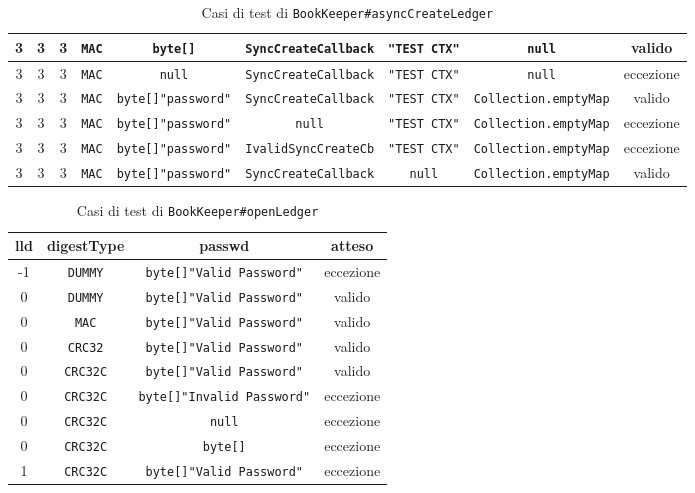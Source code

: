 \documentclass[10pt]{article}
\begin{document}
{\begin{table}[h]
{\begin{tabular}{|c|c|c|c|c|c|c|c|c|}
					\hline
					3 & 3 & 3 & \texttt{MAC} & \texttt{byte[]{}} & \texttt{SyncCreateCallback} & \texttt{"TEST CTX"} & \texttt{null} & valido \\
					\hline
					3 & 3 & 3 & \texttt{MAC} & \texttt{null} & \texttt{SyncCreateCallback} & \texttt{"TEST CTX"} & \texttt{null} & eccezione \\
					\hline
					3 & 3 & 3 & \texttt{MAC} & \texttt{byte[]{"password"}} & \texttt{SyncCreateCallback} & \texttt{"TEST CTX"} & \texttt{Collection.emptyMap} & valido \\
					\hline
					3 & 3 & 3 & \texttt{MAC} & \texttt{byte[]{"password"}} & \texttt{null} & \texttt{"TEST CTX"} & \texttt{Collection.emptyMap} & eccezione \\
					\hline
					3 & 3 & 3 & \texttt{MAC} & \texttt{byte[]{"password"}} & \texttt{IvalidSyncCreateCb} & \texttt{"TEST CTX"} & \texttt{Collection.emptyMap} & eccezione \\
					\hline
					3 & 3 & 3 & \texttt{MAC} & \texttt{byte[]{"password"}} & \texttt{SyncCreateCallback} & \texttt{null} & \texttt{Collection.emptyMap} & valido \\
					\hline
				\end{tabular}
			}
			\caption{Casi di test di \texttt{BookKeeper\#asyncCreateLedger}}
			\label{tab:test2}
		\end{table}
		
		
		\begin{table}[h]
			\centering
			\begin{tabular}{|c|c|c|c|}
				\hline
				\textbf{lld} & \textbf{digestType} & \textbf{passwd} & \textbf{atteso} \\
				\hline
				-1 & \texttt{DUMMY} & \texttt{byte[]{"Valid Password"}} & eccezione \\
				\hline
				0 & \texttt{DUMMY} & \texttt{byte[]{"Valid Password"}} & valido \\
				\hline
				0 & \texttt{MAC} & \texttt{byte[]{"Valid Password"}} & valido \\
				\hline
				0 & \texttt{CRC32} & \texttt{byte[]{"Valid Password"}} & valido \\
				\hline
				0 & \texttt{CRC32C} & \texttt{byte[]{"Valid Password"}} & valido \\
				\hline
				0 & \texttt{CRC32C} & \texttt{byte[]{"Invalid Password"}} & eccezione \\
				\hline
				0 & \texttt{CRC32C} & \texttt{null} & eccezione \\
				\hline
				0 & \texttt{CRC32C} & \texttt{byte[]{}} & eccezione \\
				\hline
				1 & \texttt{CRC32C} & \texttt{byte[]{"Valid Password"}} & eccezione \\
				\hline
			\end{tabular}
			\caption{Casi di test di \texttt{BookKeeper\#openLedger}}
			\label{tab:test3}
		\end{table}
		
}
\end{document}
